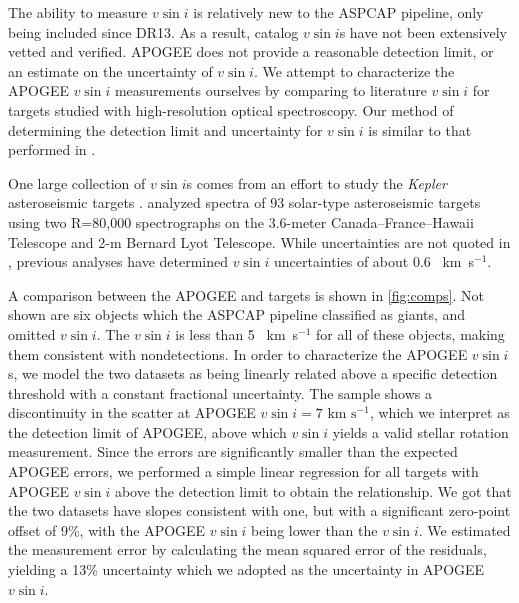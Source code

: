 \documentclass[manuscript]{aastex6}
\newcommand{\vsini}{\ensuremath{v \sin i}}
\newcommand{\Kepler}{\mbox{\textit{Kepler}}}
\newcommand{\kms}{\textrm{~km~s}\ensuremath{^{-1}}}
\begin{document}
The ability to measure \vsini{} is relatively new to the ASPCAP pipeline, only
being included since DR13. As a result, catalog \vsini{}s have not been 
extensively vetted and verified. APOGEE does not provide a reasonable
detection limit, or an estimate on the uncertainty of \vsini{}. We
attempt to characterize the APOGEE \vsini{} measurements ourselves
by comparing to literature \vsini{} for targets studied with high-resolution 
optical spectroscopy. Our method of determining the detection limit and
uncertainty for \vsini{} is similar to that performed in
\citet{Tayar15}.

One large collection of \vsini{}s comes from an effort to study the
\Kepler{} asteroseismic targets \citep{Bruntt12}. \citet{Bruntt12} analyzed 
spectra of 93 solar-type asteroseismic targets using two R=80,000 spectrographs 
on the 3.6-meter Canada--France--Hawaii Telescope and 2-m Bernard Lyot
Telescope. While uncertainties are not quoted in \citet{Bruntt12},
previous analyses have determined \vsini{} uncertainties of about 0.6
\kms \citep{Bruntt10a,Bruntt10b}.

A comparison between the APOGEE and \citet{Bruntt12} targets is shown in
\cref{fig:comps}. Not shown are six
objects which the ASPCAP pipeline classified as giants, and omitted
\vsini{}. The \citet{Bruntt12} \vsini{} is less than 5 \kms{} for all of 
these objects, making them consistent with 
nondetections.  In order to characterize the APOGEE \vsini{}s, we model the 
two datasets as being linearly related above a specific detection threshold 
with a constant fractional uncertainty. The sample shows a 
discontinuity in the scatter at APOGEE \(\vsini=7\kms\), which we 
interpret as the detection limit of APOGEE, above which \vsini{} yields a 
valid stellar rotation measurement. Since the \citet{Bruntt12} errors are
significantly smaller than the expected APOGEE errors, we performed a simple 
linear regression for all targets with APOGEE \vsini{} above the detection 
limit to obtain the relationship. We got that the two datasets have slopes
consistent with one, but with a significant zero-point offset of 9\%,
with the APOGEE \vsini{} being lower than the \citet{Bruntt12}
\vsini{}. We estimated the measurement error by calculating the mean squared 
error of the residuals, yielding a 13\% uncertainty which we adopted as the 
uncertainty in APOGEE \vsini{}.
\end{document}
